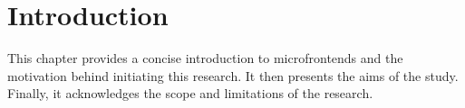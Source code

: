 \chapter{Introduction}
\label{chap:Introduction} 
This chapter provides a concise introduction to microfrontends and the motivation behind initiating this research. It then presents the aims of the study. Finally, it acknowledges the scope and limitations of the research.



